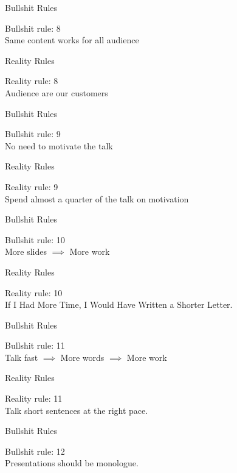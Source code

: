 \documentclass{beamer}
\newcommand{\BS}[1]{\Huge{Bullshit rule: #1}\\}
\newcommand{\RR}[1]{\color{white}\Huge{Reality rule: #1}\\}
\newcommand{\BBS}{Bullshit Rules}
\newcommand{\RRS}{\color{white}Reality Rules}
\begin{document}
\begin{frame}{\BBS}
	\begin{center}
		\BS{8}
		\Huge{Same content works for all audience}
	\end{center}
\end{frame}

\begin{frame}{\RRS}
	\begin{center}
		\RR{8}
		\Huge{Audience are our customers}
	\end{center}
\end{frame}

\begin{frame}{\BBS}
	\begin{center}
		\BS{9}
		\Huge{No need to motivate the talk}
	\end{center}
\end{frame}

\begin{frame}{\RRS}
	\begin{center}
		\RR{9}
		\Huge{Spend almost a quarter of the talk on motivation}
	\end{center}
\end{frame}

\begin{frame}{\BBS}
	\begin{center}
		\BS{10}
		\Huge{More slides $\implies$ More work}
	\end{center}
\end{frame}

\begin{frame}{\RRS}
	\begin{center}
		\RR{10}
		\Huge{If I Had More Time, I Would Have Written a Shorter Letter.}
	\end{center}
\end{frame}

\begin{frame}{\BBS}
	\begin{center}
		\BS{11}
		\Huge{Talk fast $\implies$ More words $\implies$ More work}
	\end{center}
\end{frame}

\begin{frame}{\RRS}
	\begin{center}
		\RR{11}
		\Huge{Talk short sentences at the right pace.}
	\end{center}
\end{frame}

\begin{frame}{\BBS}
	\begin{center}
		\BS{12}
		\Huge{Presentations should be monologue.}
	\end{center}
\end{frame}
\end{document}
